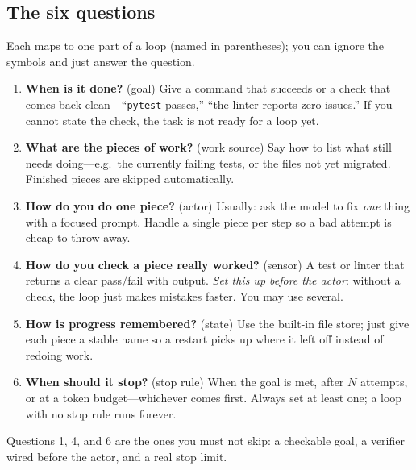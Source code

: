 \documentclass[10pt,twocolumn,letterpaper]{article}
\begin{document}
\subsection{The six questions}
Each maps to one part of a loop (named in parentheses); you can ignore the
symbols and just answer the question.
\begin{enumerate}[leftmargin=1.5em,itemsep=2.5pt,topsep=2pt,parsep=0pt]
\item \textbf{When is it done?} (goal) Give a command that succeeds or a check
that comes back clean---``\texttt{pytest} passes,'' ``the linter reports zero
issues.'' If you cannot state the check, the task is not ready for a loop yet.
\item \textbf{What are the pieces of work?} (work source) Say how to list what
still needs doing---e.g.\ the currently failing tests, or the files not yet
migrated. Finished pieces are skipped automatically.
\item \textbf{How do you do one piece?} (actor) Usually: ask the model to fix
\emph{one} thing with a focused prompt. Handle a single piece per step so a bad
attempt is cheap to throw away.
\item \textbf{How do you check a piece really worked?} (sensor) A test or linter
that returns a clear pass/fail with output. \emph{Set this up before the actor}:
without a check, the loop just makes mistakes faster. You may use several.
\item \textbf{How is progress remembered?} (state) Use the built-in file store;
just give each piece a stable name so a restart picks up where it left off
instead of redoing work.
\item \textbf{When should it stop?} (stop rule) When the goal is met, after $N$
attempts, or at a token budget---whichever comes first. Always set at least one;
a loop with no stop rule runs forever.
\end{enumerate}
Questions 1, 4, and 6 are the ones you must not skip: a checkable goal, a
verifier wired before the actor, and a real stop limit.
\end{document}
